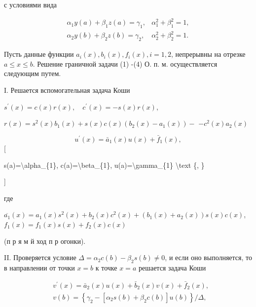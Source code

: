 \documentclass[10pt]{article}
\begin{document}
с условиями вида



\[

\begin{array}{ll}

\alpha_{1} y(a)+\beta_{1} z(a)=\gamma_{1}, & \alpha_{1}^{2}+\beta_{1}^{2}=1, \\

\alpha_{2} y(b)+\beta_{2} z(b)=\gamma_{2}, & \alpha_{2}^{2}+\beta_{2}^{2}=1 .

\end{array}

\]



Пусть данные функции $a_{i}(x), b_{i}(x), f_{i}(x), i=1,2$, непрерывны на отрезке $a \leqslant x \leqslant b$. Решение граничной задачи (1) -(4) О. п. м. осуществляется следующим путем.



I. Решается вспомогательная задача Коши



$s^{\prime}(x)=c(x) r(x), \quad c^{\prime}(x)=-s(x) r(x)$,



$r(x)=s^{2}(x) b_{1}(x)+s(x) c(x)\left(b_{2}(x)-a_{1}(x)\right)-$ $-c^{2}(x) a_{2}(x)$



\[

u^{\prime}(x)=\bar{a}_{1}(x) u(x)+\bar{f}_{1}(x),

\][



s(a)=\textbackslash alpha\_\{1\}, c(a)=\textbackslash beta\_\{1\}, u(a)=\textbackslash gamma\_\{1\} \textbackslash text \{, \}

]



где



$\overline{a_{1}}(x)=a_{1}(x) s^{2}(x)+b_{2}(x) c^{2}(x)+\left(b_{1}(x)+a_{2}(x)\right) s(x) c(x)$, $f_{1}(x)=f_{1}(x) s(x)+f_{2}(x) c(x)$



(п р я м й ход п р огонки).



II. Проверяется условие $\Delta=\alpha_{2} c(b)-\beta_{2} s(b) \neq 0$, и если оно выполняется, то в направлении от точки $x=b$ к точке $x=a$ решается задача Коши



\[

\begin{aligned}

& v^{\prime}(x)=\bar{a}_{2}(x) u(x)+\bar{b}_{2}(x) v(x)+\bar{f}_{2}(x), \\

& v(b)=\left\{\gamma_{2}-\left[\alpha_{2} s(b)+\beta_{2} c(b)\right] u(b)\right\} / \Delta,

\end{aligned}

\]
\end{document}
